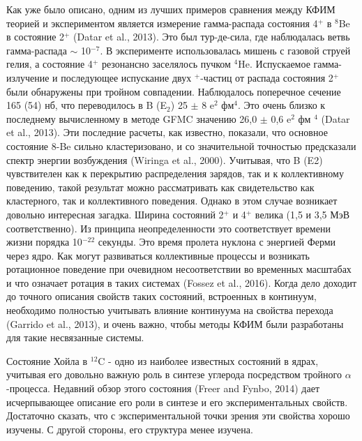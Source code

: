 \documentclass[fontsize=14pt]{scrreport}
\begin{document}
Как уже было описано, одним из лучших примеров сравнения между КФИМ теорией и экспериментом является измерение гамма-распада состояния 4$^{+}$ в $^{8}$Be в состояние 2$^{+}$ (Datar et al., 2013). Это был тур-де-сила, где наблюдалась ветвь гамма-распада $\sim$ 10$^{-7}$. В эксперименте использовалась мишень с газовой струей гелия, а состояние 4$^{+}$ резонансно заселялось пучком $^{4}$He. Испускаемое гамма-излучение и последующее испускание двух $^{+}$-частиц от распада состояния 2$^{+}$ были обнаружены при тройном совпадении. Наблюдалось поперечное сечение 165 (54) нб, что переводилось в B (E$_{2}$) 25 $\pm$ 8 e$^{2}$ фм$^{4}$. Это очень близко к последнему вычисленному в методе GFMC значению 26,0 $\pm$ 0,6 e$^{2}$ фм $^{4}$ (Datar et al., 2013). Эти последние расчеты, как известно, показали, что основное состояние 8-Be сильно кластеризовано, и со значительной точностью предсказали спектр энергии возбуждения (Wiringa et al., 2000). Учитывая, что B (E2) чувствителен как к перекрытию распределения зарядов, так и к коллективному поведению, такой результат можно рассматривать как свидетельство как кластерного, так и коллективного поведения. Однако в этом случае возникает довольно интересная загадка. Ширина состояний 2$^{+}$ и 4$^{+}$ велика (1,5 и 3,5 МэВ соответственно). Из принципа неопределенности это соответствует времени жизни порядка 10$^{-22}$ секунды. Это время пролета нуклона с энергией Ферми через ядро. Как могут развиваться коллективные процессы и возникать ротационное поведение при очевидном несоответствии во временных масштабах и что означает ротация в таких системах (Fossez et al., 2016). Когда дело доходит до точного описания свойств таких состояний, встроенных в континуум, необходимо полностью учитывать влияние континуума на свойства перехода (Garrido et al., 2013), и очень важно, чтобы методы КФИМ были разработаны для такие несвязанные системы.

Состояние Хойла в $^{12}$C - одно из наиболее известных состояний в ядрах, учитывая его довольно важную роль в синтезе углерода посредством тройного $\alpha$-процесса. Недавний обзор этого состояния (Freer and Fynbo, 2014) дает исчерпывающее описание его роли в синтезе и его экспериментальных свойств. Достаточно сказать, что с экспериментальной точки зрения эти свойства хорошо изучены. С другой стороны, его структура менее изучена.
\end{document}
